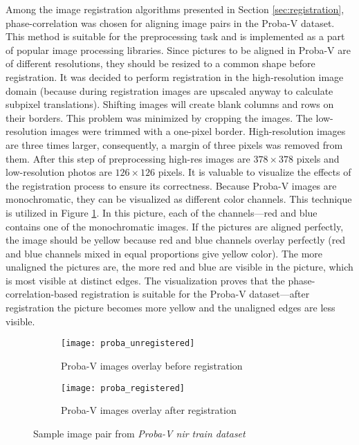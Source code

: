 Among the image registration algorithms presented in Section \ref{sec:registration}, phase-correlation was chosen for aligning image pairs in the Proba-V dataset.
This method is suitable for the preprocessing task and is implemented as a part of popular image processing libraries.
Since pictures to be aligned in Proba-V are of different resolutions, they should be resized to a common shape before registration.
It was decided to perform registration in the high-resolution image domain (because during registration images are upscaled anyway to calculate subpixel translations).
Shifting images will create blank columns and rows on their borders.
This problem was minimized by cropping the images.
The low-resolution images were trimmed with a one-pixel border.
High-resolution images are three times larger, consequently, a margin of three pixels was removed from them.
After this step of preprocessing high-res images are $ 378 \times 378 $ pixels and low-resolution photos are $ 126 \times 126 $ pixels.
It is valuable to visualize the effects of the registration process to ensure its correctness.
Because Proba-V images are monochromatic, they can be visualized as different color channels.
This technique is utilized in Figure \ref{fig:proba-registration}.
In this picture, each of the channels---red and blue contains one of the monochromatic images.
If the pictures are aligned perfectly, the image should be yellow because red and blue channels overlay perfectly (red and blue channels mixed in equal proportions give yellow color).
The more unaligned the pictures are, the more red and blue are visible in the picture, which is most visible at distinct edges.
The visualization proves that the phase-correlation-based registration is suitable for the Proba-V dataset---after registration the picture becomes more yellow and the unaligned edges are less visible.
\begin{figure}
    \begin{subfigure}{0.45\textwidth}
        \centering
        \texttt{[image: proba\_unregistered]}
        \caption{Proba-V images overlay before registration}
    \end{subfigure}
    \hfill
    \begin{subfigure}{0.45\textwidth}
        \centering
        \texttt{[image: proba\_registered]}
        \caption{Proba-V images overlay after registration}
    \end{subfigure}
    \caption{Sample image pair from \textit{Proba-V \gls{nir} train dataset}}
    \label{fig:proba-registration}
\end{figure}

